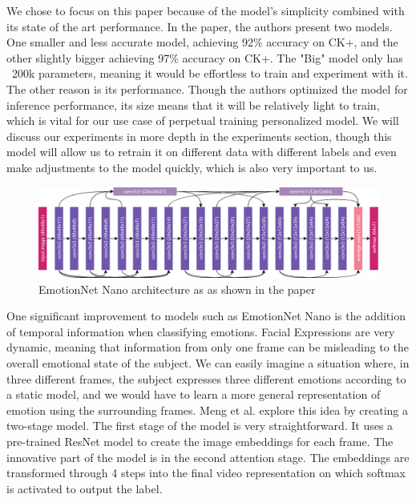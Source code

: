 \documentclass[../main.tex]{subfiles}
\begin{document}
We chose to focus on this paper because of the model's simplicity combined with its state of the art performance. In the paper,
the authors present two models. One smaller and less accurate model, achieving 92\% accuracy on CK+,
and the other slightly bigger achieving 97\% accuracy on CK+. The "Big" model only has ~200k parameters, meaning it would be effortless to
train and experiment with it. The other reason is its performance. Though the authors optimized the model for inference performance,
its size means that it will be relatively light to train, which is vital for our use case of perpetual training personalized model.
We will discuss our experiments in more depth in the experiments section, though this model will allow us to retrain it on different data
with different labels and even make adjustments to the model quickly, which is also very important to us.
\par

\begin{figure}[htp]
    \centering
    \includegraphics[width=12cm]{figures/emotionnet_nano.png}   
    \caption{EmotionNet Nano architecture as as shown in the paper \cite{emotionnet-nano}}
    \label{fig:emotionnet_nano} 
\end{figure}

One significant improvement to models such as EmotionNet Nano is the addition of temporal information when classifying emotions.
Facial Expressions are very dynamic, meaning that information from only one frame can be misleading to the overall emotional state of the subject.
We can easily imagine a situation where, in three different frames, the subject expresses three different emotions according to a static model,
and we would have to learn a more general representation of emotion using the surrounding frames.
Meng et al. \cite{fan} explore this idea by creating a two-stage model. The first stage of the model is very straightforward.
It uses a pre-trained ResNet model to create the image embeddings for each frame. The innovative part of the model is in the second attention stage.
The embeddings are transformed through 4 steps into the final video representation on which softmax is activated to output the label.
\end{document}
